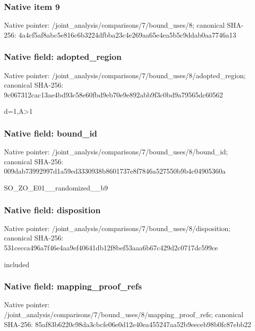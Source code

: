 \documentclass[10pt,a4paper]{article}
\begin{document}
\subsubsection{Native item 9}
Native pointer: /joint\_\allowbreak{}analysis/comparisons/7/bound\_\allowbreak{}uses/8; canonical SHA-256: 4a4cf5af8abc5e816c6b3224dfbba23c4e269aa65e4ea5b5c9ddab0aa7746a13

\subsubsection{Native field: adopted\_\allowbreak{}region}
Native pointer: /joint\_\allowbreak{}analysis/comparisons/7/bound\_\allowbreak{}uses/8/adopted\_\allowbreak{}region; canonical SHA-256: 9c067312cac13ae4bd93c58e60fbd9eb70e9e892abb9f3c0bd9a79565dc60562

\begingroup\raggedright\sloppy d=\allowbreak{}1,\allowbreak{}A>1\par\endgroup

\subsubsection{Native field: bound\_\allowbreak{}id}
Native pointer: /joint\_\allowbreak{}analysis/comparisons/7/bound\_\allowbreak{}uses/8/bound\_\allowbreak{}id; canonical SHA-256: 009dab73992997d1a59ed3330938b8601737e8f7846a527550b9b4c04905360a

\begingroup\raggedright\sloppy SO\_\allowbreak{}ZO\_\allowbreak{}E01\_\allowbreak{}\_\allowbreak{}randomized\_\allowbreak{}\_\allowbreak{}b9\par\endgroup

\subsubsection{Native field: disposition}
Native pointer: /joint\_\allowbreak{}analysis/comparisons/7/bound\_\allowbreak{}uses/8/disposition; canonical SHA-256: 531cecca496a7f46e4aa9ef40641db12f8bef53aaa6b67c429d2c0717dc599ce

\begingroup\raggedright\sloppy included\par\endgroup

\subsubsection{Native field: mapping\_\allowbreak{}proof\_\allowbreak{}refs}
Native pointer: /joint\_\allowbreak{}analysis/comparisons/7/bound\_\allowbreak{}uses/8/mapping\_\allowbreak{}proof\_\allowbreak{}refs; canonical SHA-256: 85af83b6220c98da3cbcfe06e0d12e40ea455247aa52b9eeceb98b0fc87ebb22
\end{document}
